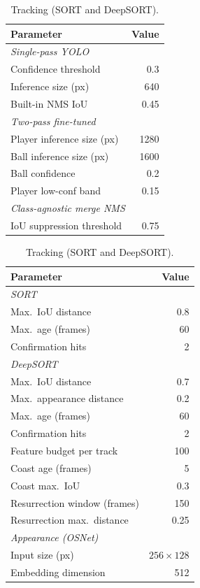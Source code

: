 \begin{table}[H]
\centering
\small
\begin{minipage}[t]{0.48\textwidth}
\centering
\caption{YOLO detection and NMS.}
\label{tab:par-yolo}
\begin{tabular}{lr}
\toprule
Parameter & Value \\
\midrule
\multicolumn{2}{l}{\textit{Single-pass YOLO}} \\
\quad Confidence threshold      & 0.3 \\
\quad Inference size (px)       & 640 \\
\quad Built-in NMS IoU          & 0.45 \\
\multicolumn{2}{l}{\textit{Two-pass fine-tuned}} \\
\quad Player inference size (px) & 1280 \\
\quad Ball inference size (px)   & 1600 \\
\quad Ball confidence            & 0.2 \\
\quad Player low-conf band       & 0.15 \\
\multicolumn{2}{l}{\textit{Class-agnostic merge NMS}} \\
\quad IoU suppression threshold & 0.75 \\
\bottomrule
\end{tabular}
\end{minipage}
\hfill
\begin{minipage}[t]{0.48\textwidth}
\centering
\caption{Tracking (SORT and DeepSORT).}
\label{tab:par-tracking}
\begin{tabular}{lr}
\toprule
Parameter & Value \\
\midrule
\multicolumn{2}{l}{\textit{SORT}} \\
\quad Max.\ IoU distance        & 0.8 \\
\quad Max.\ age (frames)        & 60 \\
\quad Confirmation hits         & 2 \\
\multicolumn{2}{l}{\textit{DeepSORT}} \\
\quad Max.\ IoU distance        & 0.7 \\
\quad Max.\ appearance distance & 0.2 \\
\quad Max.\ age (frames)        & 60 \\
\quad Confirmation hits         & 2 \\
\quad Feature budget per track  & 100 \\
\quad Coast age (frames)        & 5 \\
\quad Coast max.\ IoU           & 0.3 \\
\quad Resurrection window (frames) & 150 \\
\quad Resurrection max.\ distance  & 0.25 \\
\multicolumn{2}{l}{\textit{Appearance (OSNet)}} \\
\quad Input size (px)           & $256\times128$ \\
\quad Embedding dimension       & 512 \\
\bottomrule
\end{tabular}
\end{minipage}
\end{table}

